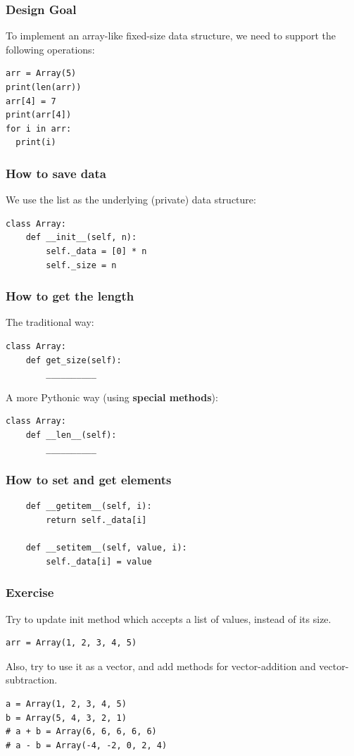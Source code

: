 \documentclass[aspectratio=169, 14pt]{beamer}
\begin{document}
\begin{frame}[fragile]
	\frametitle{Design Goal}
	To implement an array-like fixed-size data structure, we need to support the following operations:

	\begin{verbatim}
arr = Array(5)
print(len(arr))
arr[4] = 7
print(arr[4])
for i in arr:
  print(i)
\end{verbatim}
\end{frame}

\begin{frame}[fragile]
	\frametitle{How to save data}
	We use the list as the underlying (private) data structure:
	\begin{verbatim}
class Array:
    def __init__(self, n):
        self._data = [0] * n
        self._size = n
\end{verbatim}
\end{frame}

\begin{frame}[fragile]
	\frametitle{How to get the length}
	The traditional way:

	\begin{verbatim}
class Array:
    def get_size(self):
        __________
\end{verbatim}
	A more \alert{Pythonic} way (using \textbf{special methods}):
	\begin{verbatim}
class Array:
    def __len__(self):
        __________
\end{verbatim}
\end{frame}

\begin{frame}[fragile]
	\frametitle{How to set and get elements}
	\begin{verbatim}
    def __getitem__(self, i):
        return self._data[i]

    def __setitem__(self, value, i):
        self._data[i] = value
\end{verbatim}
	\pause
\end{frame}

\begin{frame}[fragile]
	\frametitle{Exercise}
	Try to update init method which accepts a list of values, instead of its size.
	\begin{verbatim}
arr = Array(1, 2, 3, 4, 5)
\end{verbatim}
	Also, try to use it as a vector, and add methods for vector-addition and vector-subtraction.
	\begin{verbatim}
a = Array(1, 2, 3, 4, 5)
b = Array(5, 4, 3, 2, 1)
# a + b = Array(6, 6, 6, 6, 6)
# a - b = Array(-4, -2, 0, 2, 4)
\end{verbatim}
\end{frame}
\end{document}
